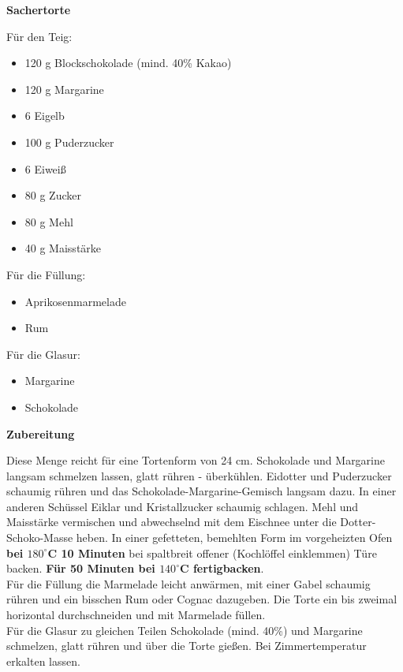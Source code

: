 
\parindent0pt	

\pagestyle{empty}


\textbf{{\LARGE Sachertorte}}%


\hrulefill
\vspace*{\fill}
\begin{multicols}{2}	


Für den Teig:
\begin{itemize}
\item 120 g 	Blockschokolade (mind. 40\% Kakao)
\item 120 g 	Margarine
\item 6  	Eigelb
\item 100 g 	Puderzucker
\item 6  	Eiweiß
\item 80 g 	Zucker
\item 80 g 	Mehl
\item40 g 	Maisstärke
\end{itemize}

Für die Füllung:
\begin{itemize}
\item Aprikosenmarmelade
\item Rum
\end{itemize}
Für die Glasur:
\begin{itemize}
\item Margarine
\item Schokolade 
\end{itemize}

\end{multicols}
\vfill
\newpage
\textbf{{\LARGE Zubereitung}}%

\hrulefill

\vspace*{\fill}
\begin{multicols}{2}


Diese Menge reicht für eine Tortenform von 24 cm.
Schokolade und Margarine langsam schmelzen lassen, glatt rühren - überkühlen.
Eidotter und Puderzucker schaumig rühren und das Schokolade-Margarine-Gemisch langsam dazu. 
In einer anderen Schüssel Eiklar und Kristallzucker schaumig schlagen. 
Mehl und Maisstärke vermischen und abwechselnd mit dem Eischnee unter die Dotter-Schoko-Masse heben.
In einer gefetteten, bemehlten Form im vorgeheizten Ofen \textbf{ bei $180^\circ$C 10 Minuten} bei spaltbreit offener 
(Kochlöffel einklemmen) Türe backen. \textbf{Für 50 Minuten bei $140^\circ$C fertigbacken}.\\

Für die Füllung die Marmelade leicht anwärmen, mit einer Gabel schaumig rühren und ein bisschen Rum oder Cognac dazugeben.
Die Torte ein bis zweimal horizontal durchschneiden und mit Marmelade füllen.\\ 

Für die Glasur zu gleichen Teilen Schokolade (mind. 40\%) und Margarine schmelzen, glatt rühren und über die Torte gießen. 
Bei Zimmertemperatur erkalten lassen.



\end{multicols}
\vfill
